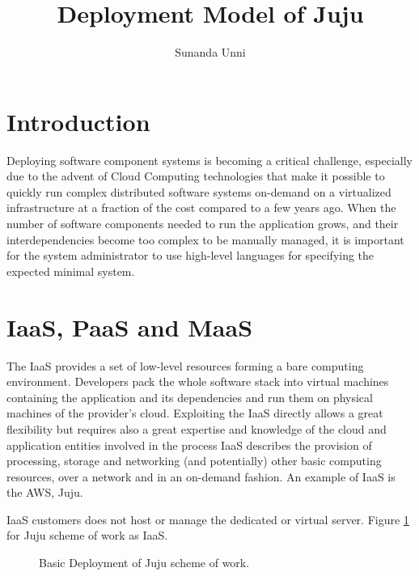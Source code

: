 \documentclass[9pt,twocolumn,twoside]{../../styles/osajnl}
\title{Deployment Model of Juju}
\author[1,*]{Sunanda Unni}
\affil[1]{School of Informatics and Computing, Bloomington, IN 47408, U.S.A.}
\affil[*]{Corresponding authors: suunni@indiana.edu}
\begin{document}
\maketitle

\section{Introduction}
Deploying software component systems \cite{lascu2015automatic} is
becoming a critical challenge, especially due to the advent of Cloud
Computing technologies that make it possible to quickly run complex
distributed software systems on-demand on a virtualized infrastructure
at a fraction of the cost compared to a few years ago. When the number
of software components needed to run the application grows, and their
interdependencies become too complex to be manually managed, it is
important for the system administrator to use high-level languages for
specifying the expected minimal system.

\section{IaaS, PaaS and MaaS}
The IaaS provides a set of low-level resources forming a bare
computing environment. Developers pack the whole software stack into
virtual machines containing the application and its dependencies and
run them on physical machines of the provider's cloud. Exploiting the
IaaS directly allows a great flexibility but requires also a great
expertise and knowledge of the cloud and application entities involved
in the process IaaS describes the provision of processing, storage and
networking (and potentially) other basic computing resources, over a
network and in an on-demand fashion. An example of IaaS is the
AWS\cite{www-aws}, Juju.

IaaS customers does not host or manage the dedicated or virtual
server. Figure \ref{fig:juju-scheme-of-work-yurkevich} for Juju
scheme of work as IaaS.

\begin{figure}[htbp]
  \centering
  \caption{Basic Deployment of Juju scheme of work.}
  \label{fig:juju-scheme-of-work-yurkevich}
\end{figure}
\end{document}
